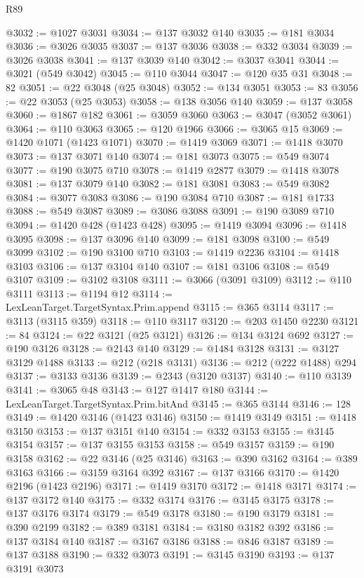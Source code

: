 \begin{lexlean}{R89}
\begin{coremodule}
@3032 := @1027 @3031
@3034 := @137 @3032 @140
@3035 := @181 @3034
@3036 := @3026 @3035
@3037 := @137 @3036
@3038 := @332 @3034
@3039 := @3026 @3038
@3041 := @137 @3039 @140
@3042 := @3037 @3041
@3044 := @3021 (@549 @3042)
@3045 := @110 @3044
@3047 := @120 @35 @31
@3048 := 82
@3051 := @22 @3048 (@25 @3048)
@3052 := @134 @3051
@3053 := 83
@3056 := @22 @3053 (@25 @3053)
@3058 := @138 @3056 @140
@3059 := @137 @3058
@3060 := @1867 @182
@3061 := @3059 @3060
@3063 := @3047 (@3052 @3061)
@3064 := @110 @3063
@3065 := @120 @1966
@3066 := @3065 @15
@3069 := @1420 @1071 (@1423 @1071)
@3070 := @1419 @3069
@3071 := @1418 @3070
@3073 := @137 @3071 @140
@3074 := @181 @3073
@3075 := @549 @3074
@3077 := @190 @3075 @710
@3078 := @1419 @2877
@3079 := @1418 @3078
@3081 := @137 @3079 @140
@3082 := @181 @3081
@3083 := @549 @3082
@3084 := @3077 @3083
@3086 := @190 @3084 @710
@3087 := @181 @1733
@3088 := @549 @3087
@3089 := @3086 @3088
@3091 := @190 @3089 @710
@3094 := @1420 @428 (@1423 @428)
@3095 := @1419 @3094
@3096 := @1418 @3095
@3098 := @137 @3096 @140
@3099 := @181 @3098
@3100 := @549 @3099
@3102 := @190 @3100 @710
@3103 := @1419 @2236
@3104 := @1418 @3103
@3106 := @137 @3104 @140
@3107 := @181 @3106
@3108 := @549 @3107
@3109 := @3102 @3108
@3111 := @3066 (@3091 @3109)
@3112 := @110 @3111
@3113 := @1194 @12
@3114 := LexLeanTarget.TargetSyntax.Prim.append
@3115 := @365 @3114
@3117 := @3113 (@3115 @359)
@3118 := @110 @3117
@3120 := @203 @1450 @2230
@3121 := 84
@3124 := @22 @3121 (@25 @3121)
@3126 := @134 @3124 @692
@3127 := @190 @3126
@3128 := @2143 @140
@3129 := @1484 @3128
@3131 := @3127 @3129 @1488
@3133 := @212 (@218 @3131)
@3136 := @212 (@222 @1488) @294
@3137 := @3133 @3136
@3139 := @2343 (@3120 @3137)
@3140 := @110 @3139
@3141 := @3065 @48
@3143 := @127 @1417 @180
@3144 := LexLeanTarget.TargetSyntax.Prim.bitAnd
@3145 := @365 @3144
@3146 := 128
@3149 := @1420 @3146 (@1423 @3146)
@3150 := @1419 @3149
@3151 := @1418 @3150
@3153 := @137 @3151 @140
@3154 := @332 @3153
@3155 := @3145 @3154
@3157 := @137 @3155 @3153
@3158 := @549 @3157
@3159 := @190 @3158
@3162 := @22 @3146 (@25 @3146)
@3163 := @390 @3162
@3164 := @389 @3163
@3166 := @3159 @3164 @392
@3167 := @137 @3166
@3170 := @1420 @2196 (@1423 @2196)
@3171 := @1419 @3170
@3172 := @1418 @3171
@3174 := @137 @3172 @140
@3175 := @332 @3174
@3176 := @3145 @3175
@3178 := @137 @3176 @3174
@3179 := @549 @3178
@3180 := @190 @3179
@3181 := @390 @2199
@3182 := @389 @3181
@3184 := @3180 @3182 @392
@3186 := @137 @3184 @140
@3187 := @3167 @3186
@3188 := @846 @3187
@3189 := @137 @3188
@3190 := @332 @3073
@3191 := @3145 @3190
@3193 := @137 @3191 @3073

\end{coremodule}
\end{lexlean}
